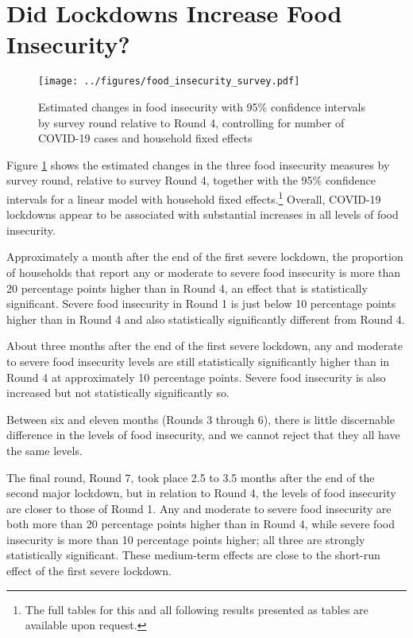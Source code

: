 \documentclass{wber}
\begin{document}
\section{Did Lockdowns Increase Food
Insecurity?}\label{did-lockdowns-increase-food-insecurity}

\begin{figure}
\centering
\texttt{[image: ../figures/food\_insecurity\_survey.pdf]}
\caption{Estimated changes in food insecurity with 95\% confidence
intervals by survey round relative to Round 4, controlling for number of
COVID-19 cases and household fixed
effects}\label{fig:food_insecurity_survey}
\end{figure}

Figure \ref{fig:food_insecurity_survey} shows the estimated changes in the
three food insecurity measures by survey round, relative to survey Round
4, together with the 95\% confidence intervals for a linear model with
household fixed effects.\footnote{The full tables for this and all
  following results presented as tables are available upon request.}
Overall, COVID-19 lockdowns appear to be associated with substantial
increases in all levels of food insecurity.

Approximately a month after the end of the first severe lockdown, the
proportion of households that report any or moderate to severe food
insecurity is more than 20 percentage points higher than in Round 4, an
effect that is statistically significant. Severe food insecurity in
Round 1 is just below 10 percentage points higher than in Round 4 and
also statistically significantly different from Round 4.

About three months after the end of the first severe lockdown, any and
moderate to severe food insecurity levels are still statistically
significantly higher than in Round 4 at approximately 10 percentage
points. Severe food insecurity is also increased but not statistically
significantly so.

Between six and eleven months (Rounds 3 through 6), there is little
discernable difference in the levels of food insecurity, and we cannot
reject that they all have the same levels.

The final round, Round 7, took place 2.5 to 3.5 months after the end of
the second major lockdown, but in relation to Round 4, the levels of
food insecurity are closer to those of Round 1. Any and moderate to
severe food insecurity are both more than 20 percentage points higher
than in Round 4, while severe food insecurity is more than 10 percentage
points higher; all three are strongly statistically significant. These
medium-term effects are close to the short-run effect of the first
severe lockdown.
\end{document}
